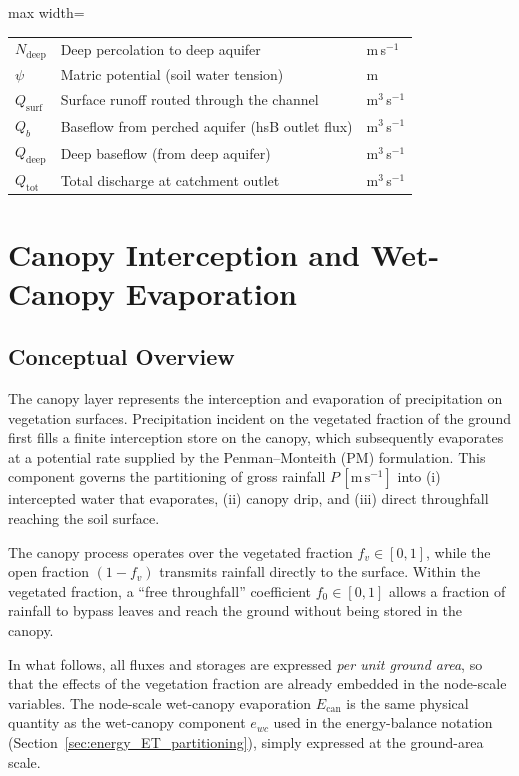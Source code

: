 \documentclass[12pt]{article}
\begin{document}
\begin{table}[h!]
\begin{adjustbox}{max width=\linewidth}
\begin{tabular}{@{}lll@{}}
$N_{\text{deep}}$ & Deep percolation to deep aquifer & m\,s$^{-1}$ \\
$\psi$ & Matric potential (soil water tension) & m \\
$Q_{\text{surf}}$ & Surface runoff routed through the channel & m$^{3}$\,s$^{-1}$ \\
$Q_b$ & Baseflow from perched aquifer (hsB outlet flux) & m$^{3}$\,s$^{-1}$ \\
$Q_{\text{deep}}$ & Deep baseflow (from deep aquifer) & m$^{3}$\,s$^{-1}$ \\
$Q_{\text{tot}}$ & Total discharge at catchment outlet & m$^{3}$\,s$^{-1}$ \\
\bottomrule
\end{tabular}\end{adjustbox}
\end{table}

\section{Canopy Interception and Wet-Canopy Evaporation}
\label{sec:canopy}

\subsection{Conceptual Overview}

The canopy layer represents the interception and evaporation of precipitation on vegetation surfaces.
Precipitation incident on the vegetated fraction of the ground first fills a finite interception store on the canopy, which subsequently evaporates at a potential rate supplied by the Penman--Monteith (PM) formulation.
This component governs the partitioning of gross rainfall \(P\,[\mathrm{m\,s^{-1}}]\) into (i) intercepted water that evaporates, (ii) canopy drip, and (iii) direct throughfall reaching the soil surface.

The canopy process operates over the vegetated fraction \(f_v\in[0,1]\), while the open fraction \((1-f_v)\) transmits rainfall directly to the surface.
Within the vegetated fraction, a ``free throughfall'' coefficient \(f_0\in[0,1]\) allows a fraction of rainfall to bypass leaves and reach the ground without being stored in the canopy.

In what follows, all fluxes and storages are expressed \emph{per unit ground area}, so that the effects of the vegetation fraction are already embedded in the node-scale variables.
The node-scale wet-canopy evaporation \(E_{\mathrm{can}}\) is the same physical quantity as the wet-canopy component \(e_{wc}\) used in the energy-balance notation (Section~\ref{sec:energy_ET_partitioning}), simply expressed at the ground-area scale.
\end{document}
